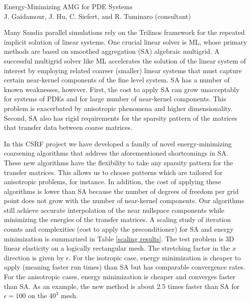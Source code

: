 \documentclass{article}
\begin{document}
\begin{centering}
{\large Energy-Minimizing AMG for PDE Systems}\\
\vskip 0.1in
J. Gaidamour, J. Hu, C. Siefert, and R. Tuminaro (consultant)\\
\vskip 0.1in
\end{centering}
Many Sandia parallel simulations rely on the Trilinos framework for the repeated implicit solution
of linear systems.
One crucial linear solver is ML, whose primary methods are based on smoothed
aggregation (SA) algebraic multigrid.
A successful multigrid solver like ML
accelerates the solution of the linear system of interest
by employing related coarser (smaller) linear systems that
must capture certain near-kernel components of the fine level system.
SA has a number of known weaknesses, however.
First, the cost to apply SA can
grow unacceptably for systems of PDEs and for large number of near-kernel components.
This problem is exacerbated by anisotropic phenomena and higher dimensionality.
Second, SA also has rigid requirements for the sparsity pattern of the matrices that transfer data between
coarse matrices.


In this CSRF project we have developed a family of novel
energy-minimizing coarsening algorithms  that address the aforementioned shortcomings in SA.
These new algorithms have the flexibility to take any sparsity pattern for the transfer
matrices.  This allows us to choose patterns which are tailored for anisotropic problems, for instance.
In addition, the cost of applying these algorithms is lower than SA because the number of
degrees of freedom per grid point does not grow with the number of near-kernel components.
Our algorithms still achieve accurate interpolation of the near nullspace
components while minimizing the energies of the transfer matrices.
A scaling study of
iteration counts and complexities (cost to apply the preconditioner) for SA and energy
minimization is summarized in Table \ref{scaling results}.  The test problem is 3D linear elasticity on
a logically rectangular mesh.  The stretching factor in the $x$ direction is given by $\epsilon$.
For the isotropic case, energy minimization is cheaper to apply (meaning faster run times) than SA but has 
comparable convergence rates.
For the anisotropic cases, energy minimization is cheaper and converges faster than SA.
As an example,
the new method is about $2.5$ times faster than SA for
$\epsilon=100$ on the $40^3$ mesh.

\newcommand{\spa}{\hspace{0.3cm}}
\end{document}
